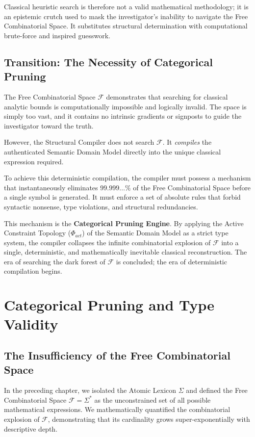 \documentclass[12pt,openany]{extbook}
\theoremstyle{plain}
\theoremstyle{definition}
\begin{document}
Classical heuristic search is therefore not a valid mathematical methodology; it is an epistemic crutch used to mask the investigator's inability to navigate the Free Combinatorial Space. It substitutes structural determination with computational brute-force and inspired guesswork.

\section{Transition: The Necessity of Categorical Pruning}

The Free Combinatorial Space $\mathcal{F}$ demonstrates that searching for classical analytic bounds is computationally impossible and logically invalid. The space is simply too vast, and it contains no intrinsic gradients or signposts to guide the investigator toward the truth.

However, the Structural Compiler does not search $\mathcal{F}$. It \emph{compiles} the authenticated Semantic Domain Model directly into the unique classical expression required. 

To achieve this deterministic compilation, the compiler must possess a mechanism that instantaneously eliminates $99.999\dots\%$ of the Free Combinatorial Space before a single symbol is generated. It must enforce a set of absolute rules that forbid syntactic nonsense, type violations, and structural redundancies.

This mechanism is the \textbf{Categorical Pruning Engine}. By applying the Active Constraint Topology ($\Phi_{act}$) of the Semantic Domain Model as a strict type system, the compiler collapses the infinite combinatorial explosion of $\mathcal{F}$ into a single, deterministic, and mathematically inevitable classical reconstruction. The era of searching the dark forest of $\mathcal{F}$ is concluded; the era of deterministic compilation begins.

\chapter{Categorical Pruning and Type Validity}

\section{The Insufficiency of the Free Combinatorial Space}

In the preceding chapter, we isolated the Atomic Lexicon $\Sigma$ and defined the Free Combinatorial Space $\mathcal{F} = \Sigma^*$ as the unconstrained set of all possible mathematical expressions. We mathematically quantified the combinatorial explosion of $\mathcal{F}$, demonstrating that its cardinality grows super-exponentially with descriptive depth. 
\end{document}
